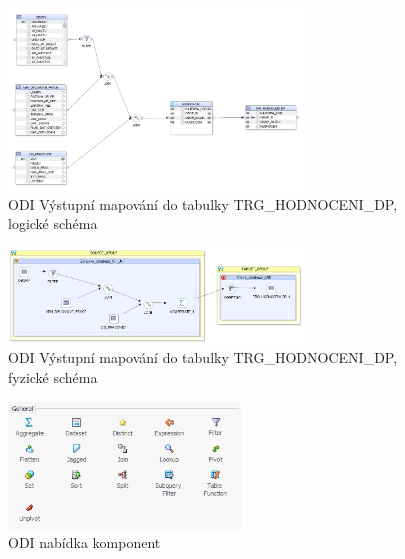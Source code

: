 \begin{figure}[htb]
    \centering
    \includegraphics[width=0.7\textwidth]{graphs/odi-mapping-trg-hodnoceni-dp.png}
    \caption{ODI Výstupní mapování do tabulky TRG\_HODNOCENI\_DP, logické schéma}
    \label{fig:odi-mapping-trg-hodnoceni}
\end{figure}
\FloatBarrier

\begin{figure}[htb]
    \centering
    \includegraphics[width=0.7\textwidth]{graphs/odi-mapping-trg-hodnoceni-dp-physical.png}
    \caption{ODI Výstupní mapování do tabulky TRG\_HODNOCENI\_DP, fyzické schéma}
    \label{fig:odi-mapping-trg-hodnoceni-physical}
\end{figure}
\FloatBarrier

\begin{figure}[htb]
    \centering
    \includegraphics[width=0.55\textwidth]{graphs/odi-transformation-components.png}
    \caption{ODI nabídka komponent}
    \label{fig:odi-transformation-components}
\end{figure}
\FloatBarrier

